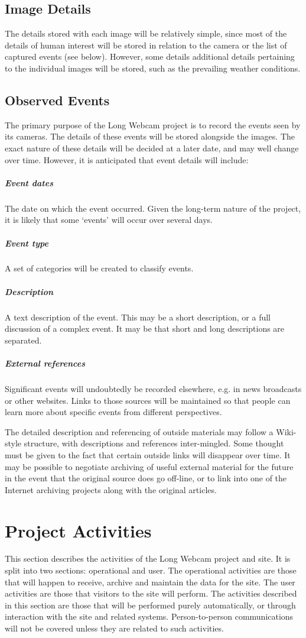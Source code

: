 \documentclass[11pt]{article}
\begin{document}
\subsection{Image Details}
The details stored with each image will be relatively simple, since most of the details of human interest will be stored in relation to the camera or the list of captured events (see below). However, some details additional details pertaining to the individual images will be stored, such as the prevailing weather conditions.

\subsection{Observed Events}
The primary purpose of the Long Webcam project is to record the events seen by its cameras. The details of these events will be stored alongside the images. The exact nature of these details will be decided at a later date, and may well change over time. However, it is anticipated that event details will include:

\subparagraph{Event dates} The date on which the event occurred. Given the long-term nature of the project, it is likely that some `events' will occur over several days.
\subparagraph{Event type} A set of categories will be created to classify events.
\subparagraph{Description} A text description of the event. This may be a short description, or a full discussion of a complex event. It may be that short and long descriptions are separated.
\subparagraph{External references} Significant events will undoubtedly be recorded elsewhere, e.g. in news broadcasts or other websites. Links to those sources will be maintained so that people can learn more about specific events from different perspectives.

\vspace{0.75cm}
The detailed description and referencing of outside materials may follow a Wiki-style structure, with descriptions and references inter-mingled. Some thought must be given to the fact that certain outside links will disappear over time. It may be possible to negotiate archiving of useful external material for the future in the event that the original source does go off-line, or to link into one of the Internet archiving projects along with the original articles.

\clearpage
\section{Project Activities}
This section describes the activities of the Long Webcam project and site. It is split into two sections: operational and user. The operational activities are those that will happen to receive, archive and maintain the data for the site. The user activities are those that visitors to the site will perform. The activities described in this section are those that will be performed purely automatically, or through interaction with the site and related systems. Person-to-person communications will not be covered unless they are related to such activities.
\end{document}
